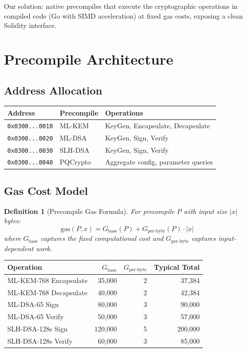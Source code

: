 \documentclass[11pt,letterpaper]{article}
\newtheorem{definition}{Definition}
\begin{document}
Our solution: native precompiles that execute the cryptographic operations in compiled code (Go with SIMD acceleration) at fixed gas costs, exposing a clean Solidity interface.

\section{Precompile Architecture}

\subsection{Address Allocation}

\begin{table}[h]
\centering
\begin{tabular}{lll}
\toprule
\textbf{Address} & \textbf{Precompile} & \textbf{Operations} \\
\midrule
\texttt{0x0300...0010} & ML-KEM & KeyGen, Encapsulate, Decapsulate \\
\texttt{0x0300...0020} & ML-DSA & KeyGen, Sign, Verify \\
\texttt{0x0300...0030} & SLH-DSA & KeyGen, Sign, Verify \\
\texttt{0x0300...0040} & PQCrypto & Aggregate config, parameter queries \\
\bottomrule
\end{tabular}
\end{table}

\subsection{Gas Cost Model}

\begin{definition}[Precompile Gas Formula]
For precompile $P$ with input size $|x|$ bytes:
\[
\text{gas}(P, x) = G_{\text{base}}(P) + G_{\text{per-byte}}(P) \cdot |x|
\]
where $G_{\text{base}}$ captures the fixed computational cost and $G_{\text{per-byte}}$ captures input-dependent work.
\end{definition}

\begin{table}[h]
\centering
\begin{tabular}{lrrr}
\toprule
\textbf{Operation} & \textbf{$G_{\text{base}}$} & \textbf{$G_{\text{per-byte}}$} & \textbf{Typical Total} \\
\midrule
ML-KEM-768 Encapsulate & 35,000 & 2 & 37,384 \\
ML-KEM-768 Decapsulate & 40,000 & 2 & 42,384 \\
ML-DSA-65 Sign & 80,000 & 3 & 90,000 \\
ML-DSA-65 Verify & 50,000 & 3 & 57,000 \\
SLH-DSA-128s Sign & 120,000 & 5 & 200,000 \\
SLH-DSA-128s Verify & 60,000 & 3 & 85,000 \\
\bottomrule
\end{tabular}
\end{table}
\end{document}
